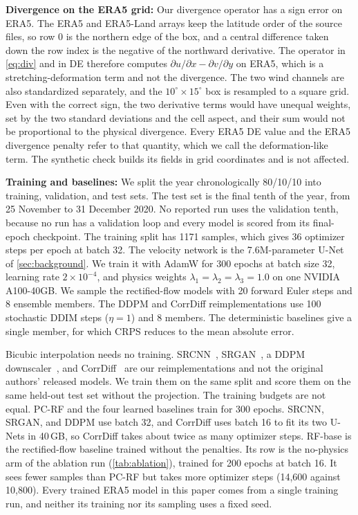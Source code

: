 \documentclass[sigconf,nonacm]{acmart}
\newcommand{\pcrf}{\textsc{PC-RF}\xspace}
\begin{document}
\textbf{Divergence on the ERA5 grid:} Our divergence operator has a sign error on ERA5. The ERA5 and ERA5-Land arrays keep the latitude order of the source files, so row 0 is the northern edge of the box, and a central difference taken down the row index is the negative of the northward derivative. The operator in \cref{eq:div} and in DE therefore computes $\partial u/\partial x - \partial v/\partial y$ on ERA5, which is a stretching-deformation term and not the divergence. The two wind channels are also standardized separately, and the $10^\circ \times 15^\circ$ box is resampled to a square grid. Even with the correct sign, the two derivative terms would have unequal weights, set by the two standard deviations and the cell aspect, and their sum would not be proportional to the physical divergence. Every ERA5 DE value and the ERA5 divergence penalty refer to that quantity, which we call the deformation-like term. The synthetic check builds its fields in grid coordinates and is not affected.

\textbf{Training and baselines:} We split the year chronologically 80/10/10 into training, validation, and test sets. The test set is the final tenth of the year, from 25 November to 31 December 2020. No reported run uses the validation tenth, because no run has a validation loop and every model is scored from its final-epoch checkpoint. The training split has 1171 samples, which gives 36 optimizer steps per epoch at batch 32. The velocity network is the 7.6M-parameter U-Net of \cref{sec:background}. We train it with AdamW for 300 epochs at batch size 32, learning rate $2{\times}10^{-4}$, and physics weights $\lambda_1{=}\lambda_2{=}\lambda_3{=}1.0$ on one NVIDIA A100-40GB. We sample the rectified-flow models with 20 forward Euler steps and 8 ensemble members. The DDPM and CorrDiff reimplementations use 100 stochastic DDIM steps ($\eta = 1$) and 8 members. The deterministic baselines give a single member, for which CRPS reduces to the mean absolute error.

Bicubic interpolation needs no training. SRCNN~\citep{dong2015image}, SRGAN~\citep{ledig2017photo}, a DDPM downscaler~\citep{ho2020denoising}, and CorrDiff~\citep{mardani2023residual} are our reimplementations and not the original authors' released models. We train them on the same split and score them on the same held-out test set without the projection. The training budgets are not equal. \pcrf and the four learned baselines train for 300 epochs. SRCNN, SRGAN, and DDPM use batch 32, and CorrDiff uses batch 16 to fit its two U-Nets in 40\,GB, so CorrDiff takes about twice as many optimizer steps. RF-base is the rectified-flow baseline trained without the penalties. Its row is the no-physics arm of the ablation run (\cref{tab:ablation}), trained for 200 epochs at batch 16. It sees fewer samples than \pcrf but takes more optimizer steps (14{,}600 against 10{,}800). Every trained ERA5 model in this paper comes from a single training run, and neither its training nor its sampling uses a fixed seed.
\end{document}
